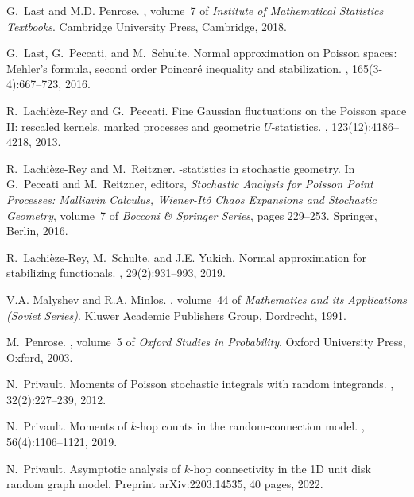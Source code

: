\documentclass[12pt]{article}
\numberwithin{equation}{section}
\begin{document}
\begin{thebibliography}{BRSW17}
G.~Last and M.D. Penrose.
, volume~7 of {\em Institute
  of Mathematical Statistics Textbooks}.
\newblock Cambridge University Press, Cambridge, 2018.

G.~Last, G.~Peccati, and M.~Schulte.
\newblock Normal approximation on {P}oisson spaces: {M}ehler's formula, second
  order {P}oincar\'e inequality and stabilization.
, 165(3-4):667--723, 2016.

R.~Lachi\`eze-Rey and G.~Peccati.
\newblock Fine {G}aussian fluctuations on the {P}oisson space {II}: rescaled
  kernels, marked processes and geometric {$U$}-statistics.
, 123(12):4186--4218, 2013.

R.~Lachi\`eze-Rey and M.~Reitzner.
-statistics in stochastic geometry.
\newblock In G.~Peccati and M.~Reitzner, editors, {\em Stochastic Analysis for
  {P}oisson Point Processes: {M}alliavin Calculus, {W}iener-{I}t{\^o} Chaos
  Expansions and Stochastic Geometry}, volume~7 of {\em Bocconi \& Springer
  Series}, pages 229--253. Springer, Berlin, 2016.

R.~Lachi\`eze-Rey, M.~Schulte, and J.E. Yukich.
\newblock Normal approximation for stabilizing functionals.
, 29(2):931--993, 2019.

V.A. Malyshev and R.A. Minlos.
, volume~44 of {\em Mathematics and its
  Applications (Soviet Series)}.
\newblock Kluwer Academic Publishers Group, Dordrecht, 1991.

M.~Penrose.
, volume~5 of {\em Oxford Studies in
  Probability}.
\newblock Oxford University Press, Oxford, 2003.

N.~Privault.
\newblock Moments of {P}oisson stochastic integrals with random integrands.
, 32(2):227--239, 2012.

N.~Privault.
\newblock Moments of $k$-hop counts in the random-connection model.
, 56(4):1106--1121, 2019.

N.~Privault.
\newblock Asymptotic analysis of $k$-hop connectivity in the 1{D} unit disk
  random graph model.
\newblock Preprint arXiv:2203.14535, 40 pages, 2022.


\end{thebibliography}
\end{document}
